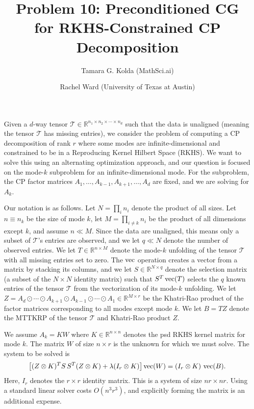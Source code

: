 

\title{Problem 10: Preconditioned CG for RKHS-Constrained CP Decomposition}
\author{Tamara G. Kolda (MathSci.ai) \and Rachel Ward (University of Texas at Austin)}
\date{}


\maketitle

Given a $d$-way tensor $\mathcal{T} \in \mathbb{R}^{n_1 \times n_2 \times \cdots \times n_d}$ such that the data is unaligned (meaning the tensor $\mathcal{T}$ has missing entries), we consider the problem of computing a CP decomposition of rank $r$ where some modes are infinite-dimensional and constrained to be in a Reproducing Kernel Hilbert Space (RKHS). We want to solve this using an alternating optimization approach, and our question is focused on the mode-$k$ subproblem for an infinite-dimensional mode. For the subproblem, the CP factor matrices $A_1, \dots, A_{k-1}, A_{k+1}, \dots, A_d$ are fixed, and we are solving for $A_k$.

Our notation is as follows. Let $N = \prod_i n_i$ denote the product of all sizes. Let $n \equiv n_k$ be the size of mode $k$, let $M = \prod_{i\neq k} n_i$ be the product of all dimensions except $k$, and assume $n \ll M$. Since the data are unaligned, this means only a subset of $\mathcal{T}$'s entries are observed, and we let $q \ll N$ denote the number of observed entries. We let $T \in \mathbb{R}^{n \times M}$ denote the mode-$k$ unfolding of the tensor $\mathcal{T}$ with all missing entries set to zero. The $\operatorname{vec}$ operation creates a vector from a matrix by stacking its columns, and we let $S \in \mathbb{R}^{N \times q}$ denote the selection matrix (a subset of the $N \times N$ identity matrix) such that $S^T \operatorname{vec}(T)$ selects the $q$ known entries of the tensor $\mathcal{T}$ from the vectorization of its mode-$k$ unfolding. We let $Z = A_d \odot \cdots \odot A_{k+1} \odot A_{k-1} \odot \cdots \odot A_1 \in \mathbb{R}^{M \times r}$ be the Khatri-Rao product of the factor matrices corresponding to all modes except mode $k$. We let $B = TZ$ denote the MTTKRP of the tensor $\mathcal{T}$ and Khatri-Rao product $Z$.

We assume $A_k = KW$ where $K \in \mathbb{R}^{n \times n}$ denotes the psd RKHS kernel matrix for mode $k$. The matrix $W$ of size $n \times r$ is the unknown for which we must solve. The system to be solved is
\begin{equation}
  \left[
    (Z \otimes K)^T S\,
    S^T (Z \otimes K)
    + \lambda (I_r \otimes K)
  \right] \operatorname{vec}(W)
  = (I_r \otimes K)\,\operatorname{vec}(B). \nonumber
\end{equation}
Here, $I_r$ denotes the $r \times r$ identity matrix. This is a system of size $nr \times nr$. Using a standard linear solver costs $O(n^3 r^3)$, and explicitly forming the matrix is an additional expense.

